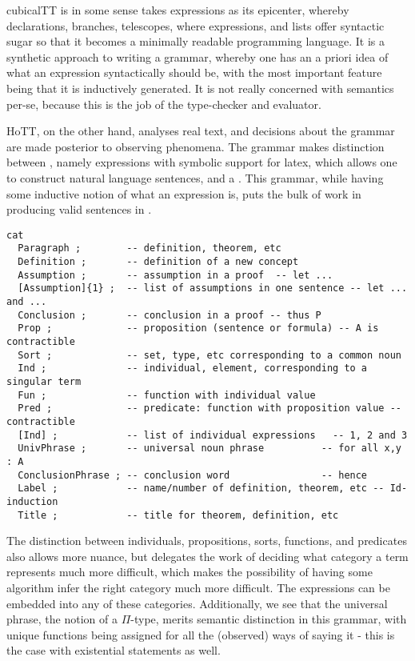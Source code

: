 cubicalTT is in some sense takes expressions as its epicenter, whereby
declarations, branches, telescopes, where expressions, and lists offer syntactic
sugar so that it becomes a minimally readable programming language. It is a
synthetic approach to writing a grammar, whereby one has an a priori idea of
what an expression syntactically should be, with the most important feature
being that it is inductively generated. It is not really concerned with
semantics per-se, because this is the job of the type-checker and evaluator.

HoTT, on the other hand, analyses real text, and decisions about the grammar are
made posterior to observing phenomena.  The grammar makes distinction between
, namely expressions with symbolic support for latex, 
 which allows one to construct natural language sentences,
and a . This grammar, while having some inductive notion
of what an expression is, puts the bulk of work in producing valid sentences in .

\begin{verbatim}
cat
  Paragraph ;        -- definition, theorem, etc
  Definition ;       -- definition of a new concept
  Assumption ;       -- assumption in a proof  -- let ...
  [Assumption]{1} ;  -- list of assumptions in one sentence -- let ... and ...
  Conclusion ;       -- conclusion in a proof -- thus P
  Prop ;             -- proposition (sentence or formula) -- A is contractible
  Sort ;             -- set, type, etc corresponding to a common noun
  Ind ;              -- individual, element, corresponding to a singular term
  Fun ;              -- function with individual value
  Pred ;             -- predicate: function with proposition value -- contractible
  [Ind] ;            -- list of individual expressions   -- 1, 2 and 3
  UnivPhrase ;       -- universal noun phrase          -- for all x,y : A
  ConclusionPhrase ; -- conclusion word                -- hence
  Label ;            -- name/number of definition, theorem, etc -- Id-induction
  Title ;            -- title for theorem, definition, etc
\end{verbatim}

The distinction between individuals, propositions,
sorts, functions, and predicates also allows more nuance, but delegates the work
of deciding what category a term represents much more difficult, which makes the
possibility of having some algorithm infer the right category much more
difficult. The expressions can be embedded into any of these categories.  Additionally, 
we see that the universal phrase, the notion of a $\Pi$-type, merits semantic 
distinction in this grammar, with unique functions being assigned for all the
(observed) ways of saying it - this is the case with existential statements as well.

